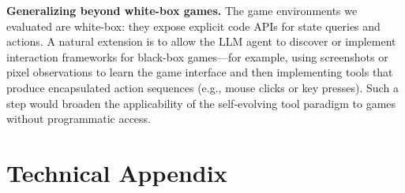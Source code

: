 \documentclass{article}
\begin{document}
\textbf{Generalizing beyond white-box games.}
The game environments we evaluated are white-box: they expose explicit code APIs for state queries and actions. A natural extension is to allow the LLM agent to discover or implement interaction frameworks for black-box games---for example, using screenshots or pixel observations to learn the game interface and then implementing tools that produce encapsulated action sequences (e.g., mouse clicks or key presses). Such a step would broaden the applicability of the self-evolving tool paradigm to games without programmatic access.










\newpage

\appendix

\section{Technical Appendix}
\end{document}
